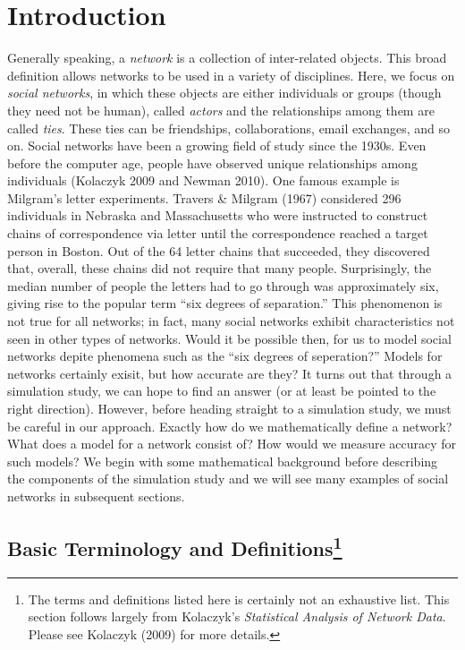 \documentclass[12pt,twoside]{amherstthesis}
\begin{document}
  
  \mainmatter %
  \pagestyle{fancyplain} %

  \chapter*{Introduction}\label{introduction}
  
  Generally speaking, a \emph{network} is a collection of inter-related
  objects. This broad definition allows networks to be used in a variety
  of disciplines. Here, we focus on \emph{social networks}, in which these
  objects are either individuals or groups (though they need not be
  human), called \emph{actors} and the relationships among them are called
  \emph{ties}. These ties can be friendships, collaborations, email
  exchanges, and so on. Social networks have been a growing field of study
  since the 1930s. Even before the computer age, people have observed
  unique relationships among individuals (Kolaczyk 2009 and Newman 2010).
  One famous example is Milgram's letter experiments. Travers \& Milgram
  (1967) considered 296 individuals in Nebraska and Massachusetts who were
  instructed to construct chains of correspondence via letter until the
  correspondence reached a target person in Boston. Out of the 64 letter
  chains that succeeded, they discovered that, overall, these chains did
  not require that many people. Surprisingly, the median number of people
  the letters had to go through was approximately six, giving rise to the
  popular term ``six degrees of separation.'' This phenomenon is not true
  for all networks; in fact, many social networks exhibit characteristics
  not seen in other types of networks. Would it be possible then, for us
  to model social networks depite phenomena such as the ``six degrees of
  seperation?'' Models for networks certainly exisit, but how accurate are
  they? It turns out that through a simulation study, we can hope to find
  an answer (or at least be pointed to the right direction). However,
  before heading straight to a simulation study, we must be careful in our
  approach. Exactly how do we mathematically define a network? What does a
  model for a network consist of? How would we measure accuracy for such
  models? We begin with some mathematical background before describing the
  components of the simulation study and we will see many examples of
  social networks in subsequent sections.
  
  \section[Basic Terminology and Definitions]{\texorpdfstring{Basic
  Terminology and Definitions\footnote{The terms and definitions listed
    here is certainly not an exhaustive list. This section follows largely
    from Kolaczyk's \emph{Statistical Analysis of Network Data}. Please
    see Kolaczyk (2009) for more details.}}{Basic Terminology and Definitions}}\label{basic-terminology-and-definitions-1}
  
\end{document}
